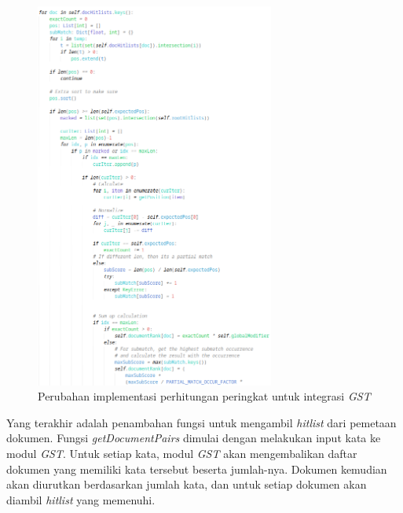 \begin{figure}[H]
  \centering{}
	\includegraphics[width=0.7\textwidth]{gambar/implementasi_gst_calculateranking}
  \caption{Perubahan implementasi perhitungan peringkat untuk integrasi
  \textit{GST}}
\end{figure}

Yang terakhir adalah penambahan fungsi untuk mengambil \textit{hitlist} dari 
pemetaan dokumen. Fungsi \textit{getDocumentPairs} dimulai dengan melakukan 
input kata ke modul \textit{GST}. Untuk setiap kata, modul \textit{GST} akan 
mengembalikan daftar dokumen yang memiliki kata tersebut beserta jumlah-nya. 
Dokumen kemudian akan diurutkan berdasarkan jumlah kata, dan untuk setiap 
dokumen akan diambil \textit{hitlist} yang memenuhi.

